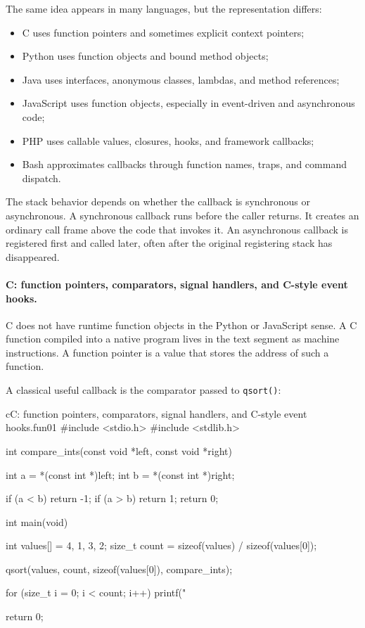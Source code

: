 The same idea appears in many languages, but the representation differs:

\begin{itemize}
    \item C uses function pointers and sometimes explicit context pointers;
    \item Python uses function objects and bound method objects;
    \item Java uses interfaces, anonymous classes, lambdas, and method references;
    \item JavaScript uses function objects, especially in event-driven and asynchronous code;
    \item PHP uses callable values, closures, hooks, and framework callbacks;
    \item Bash approximates callbacks through function names, traps, and command dispatch.
\end{itemize}

The stack behavior depends on whether the callback is synchronous or asynchronous. A synchronous callback runs before the caller returns. It creates an ordinary call frame above the code that invokes it. An asynchronous callback is registered first and called later, often after the original registering stack has disappeared.

\paragraph{C: function pointers, comparators, signal handlers, and C-style event hooks.}

C does not have runtime function objects in the Python or JavaScript sense. A C function compiled into a native program lives in the text segment as machine instructions. A function pointer is a value that stores the address of such a function.

A classical useful callback is the comparator passed to \texttt{qsort()}:

\begin{codebox}[]{c}{C: function pointers, comparators, signal handlers, and C-style event hooks.}{fun01}
#include <stdio.h>
#include <stdlib.h>

int compare_ints(const void *left, const void *right) {
    int a = *(const int *)left;
    int b = *(const int *)right;

    if (a < b) return -1;
    if (a > b) return 1;
    return 0;
}

int main(void) {
    int values[] = {4, 1, 3, 2};
    size_t count = sizeof(values) / sizeof(values[0]);

    qsort(values, count, sizeof(values[0]), compare_ints);

    for (size_t i = 0; i < count; i++) {
        printf("%
    }

    return 0;
}
\end{codebox}


